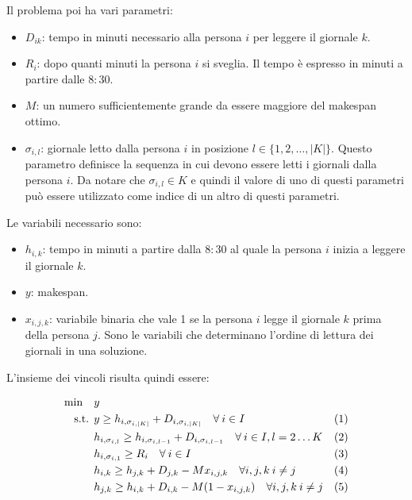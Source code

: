 Il problema poi ha vari parametri:
\begin{itemize}
	\item $D_{ik}$: tempo in minuti necessario alla persona $i$ per leggere il giornale $k$.
	\item $R_i$: dopo quanti minuti la persona $i$ si sveglia. Il tempo è espresso in minuti a partire dalle $8:30$.
	\item $M$: un numero sufficientemente grande da essere maggiore del makespan ottimo.
	\item $\sigma_{i,l}$: giornale letto dalla persona $i$ in posizione $l \in \{1,2,\ldots, |K| \}$. Questo parametro definisce la sequenza in cui devono essere letti i giornali dalla persona $i$. Da notare che $\sigma_{i,l} \in K$ e quindi il valore di uno di questi parametri può essere utilizzato come indice di un altro di questi parametri.
\end{itemize}

\noindent Le variabili necessario sono:
\begin{itemize}
	\item $h_{i,k}$: tempo in minuti a partire dalla $8:30$ al quale la persona $i$ inizia a leggere il giornale $k$.
	\item $y$: makespan.
	\item $x_{i,j,k}$: variabile binaria che vale 1 se la persona $i$ legge il giornale $k$ prima della persona $j$. Sono le variabili che determinano l'ordine di lettura dei giornali in una soluzione.
\end{itemize}

\noindent L'insieme dei vincoli risulta quindi essere:

\begin{align*}
\min \quad & y \\
\text{s.t. } & y \geq h_{i, \sigma_{i,|K|}} + D_{i, \sigma_{i,|K|}} \quad \forall \: i \in I &(1) \\
	& h_{i, \sigma_{i,l} } \geq h_{i, \sigma_{i,l-1} } + D_{i , \sigma_{i, l-1}} \quad \forall \:i \in I, l = 2 \ldots K &(2) \\
	& h_{i, \sigma_{i,1}} \geq R_i \quad \forall \: i \in I &(3) \\
	& h_{i,k} \geq h_{j,k} + D_{j,k} - M x_{i,j,k} \quad \forall i,j,k \: i \neq j &(4) \\
	& h_{j,k} \geq h_{i,k} + D_{i,k} - M (1 -x_{i,j,k} )\quad \forall i,j,k \: i \neq j &(5) \\
\end{align*}

